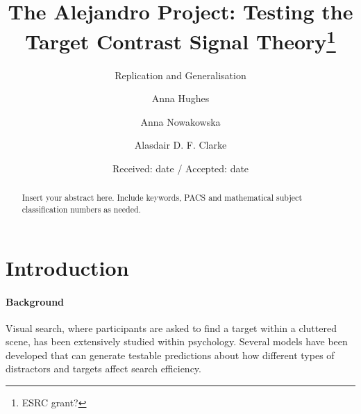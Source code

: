 \documentclass[smallextended, natbib]{svjour3}       %
\begin{document}
\title{The Alejandro Project: Testing the Target Contrast Signal Theory\thanks{ESRC grant?}
}
\subtitle{Replication and Generalisation}


\author{Anna Hughes \and Anna Nowakowska \and Alasdair D. F. Clarke}



\date{Received: date / Accepted: date}

\maketitle

\begin{abstract}
Insert your abstract here. Include keywords, PACS and mathematical
subject classification numbers as needed.
\end{abstract}

\section{Introduction}
\label{intro}

\paragraph{Background}
Visual search, where participants are asked to find a target within a cluttered scene, has been extensively studied within psychology. Several models have been developed that can generate testable predictions about how different types of distractors and targets affect search efficiency.
\end{document}
